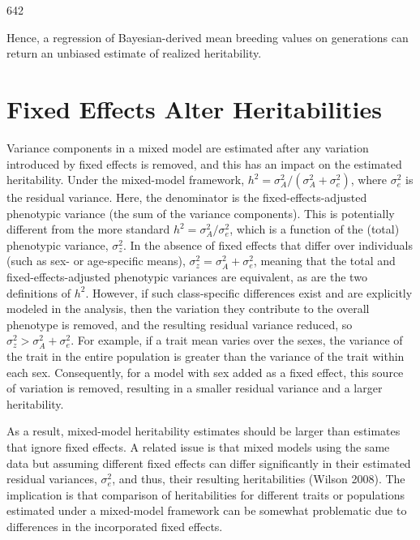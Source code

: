 \documentclass{article}
\begin{document}
642

Hence, a regression of Bayesian-derived mean breeding values on generations can return an unbiased estimate of realized heritability.

\section{Fixed Effects Alter Heritabilities}
Variance components in a mixed model are estimated after any variation introduced by fixed effects is removed, and this has an impact on the estimated heritability. Under the mixed-model framework,  $ h^2 = \sigma_A^2 / (\sigma_A^2 + \sigma_e^2) $, where  $ \sigma_e^2 $ is the residual variance. Here, the denominator is the fixed-effects-adjusted phenotypic variance (the sum of the variance components). This is potentially different from the more standard  $ h^2 = \sigma_A^2 / \sigma_e^2 $, which is a function of the (total) phenotypic variance,  $ \sigma_z^2 $. In the absence of fixed effects that differ over individuals (such as sex- or age-specific means),  $ \sigma_z^2 = \sigma_A^2 + \sigma_e^2 $, meaning that the total and fixed-effects-adjusted phenotypic variances are equivalent, as are the two definitions of  $ h^2 $. However, if such class-specific differences exist and are explicitly modeled in the analysis, then the variation they contribute to the overall phenotype is removed, and the resulting residual variance reduced, so  $ \sigma_z^2 > \sigma_A^2 + \sigma_e^2 $. For example, if a trait mean varies over the sexes, the variance of the trait in the entire population is greater than the variance of the trait within each sex. Consequently, for a model with sex added as a fixed effect, this source of variation is removed, resulting in a smaller residual variance and a larger heritability.

As a result, mixed-model heritability estimates should be larger than estimates that ignore fixed effects. A related issue is that mixed models using the same data but assuming different fixed effects can differ significantly in their estimated residual variances,  $ \sigma_{e}^{2} $, and thus, their resulting heritabilities (Wilson 2008). The implication is that comparison of heritabilities for different traits or populations estimated under a mixed-model framework can be somewhat problematic due to differences in the incorporated fixed effects.
\end{document}
